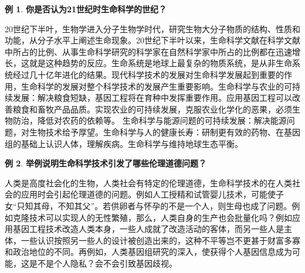 \documentclass[UTF8]{article}
\theoremstyle{definition}
\newtheorem{example}{例}[section]
\begin{document}
\begin{example}\textbf{你是否认为21世纪时生命科学的世纪？}

    20世纪下半叶，生物学进入分子生物学时代，研究生物大分子物质的结构、性质和功能，从分子水平上阐述生命现象。20世纪下半叶以来，生命科学文献在科学文献中所占的比例、从事生命科学研究的科学家在自然科学家中所占的比例都在迅速增长，这就是这种趋势的反应。生命系统是地球上最复杂的物质系统，是从非生命系统经过几十亿年进化的结果。现代科学技术的发展对生命科学发展起到重要的作用，生命科学的发展对整个科学技术的发展产生重要影响。生命科学与农业的可持续发展：解决粮食短缺，基因工程将在育种中发挥重要作用。应用基因工程可以改善粮食和畜牧产品品质。实现农业的可持续发展，克服农业化学化的恶果，必须生物防治，降低对农药的依赖等。 生命科学与能源问题的可持续发展：解决能源问题，对生物技术给予厚望。生命科学与人的健康长寿：研制更有效的药物、在基因组的基础上认识人体，理解疾病。生命科学与维持地球生态平衡。
\end{example}
\begin{example}\textbf{举例说明生命科学技术引发了哪些伦理道德问题？}
    
    人类是高度社会化的生物，人类社会有特定的伦理道德，生命科学技术的在人类社会的应用时会引起伦理道德的问题。例如人工授精和试管婴儿技术，可能使子女“只知其母，不知其父”。若供卵者与怀孕的不是一个人，则生母也成了问题。例如克隆技术可以实现人的无性繁殖，那么，人类自身的生产也会批量化吗？例如应用基因工程技术改造人类本身，一些人成就了改造活动的客体，而另一些人是主体，一些认识按照另一些人的设计被创造出来的，这种不平等岂不更甚于财富多寡和政治地位的不同。再例如，人类基因组研究的深入，使获得个人基因信息成为可能，这是不是个人隐私？会不会引致基因歧视。
\end{example}
\end{document}
